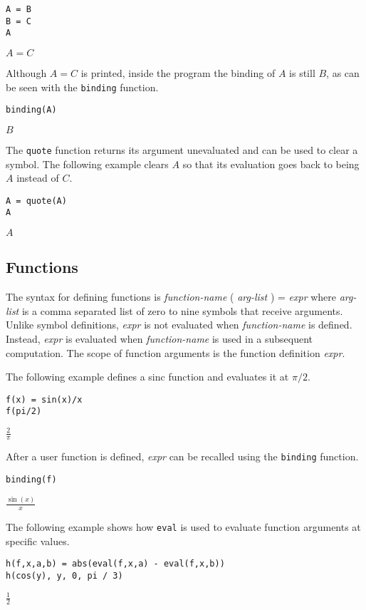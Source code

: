 {\color{blue}
\begin{verbatim}
A = B
B = C
A
\end{verbatim}
}

\noindent
$\displaystyle A=C$

\bigskip
\noindent
Although $A=C$ is printed,
inside the program the binding of $A$ is still $B$, as can be seen with
the \verb$binding$ function.

{\color{blue}
\begin{verbatim}
binding(A)
\end{verbatim}
}

\noindent
$\displaystyle B$

\bigskip
\noindent
The \verb$quote$ function returns its argument unevaluated
and can be used to clear a symbol.
The following example clears $A$ so that its evaluation goes back to
being $A$ instead of $C$.

{\color{blue}
\begin{verbatim}
A = quote(A)
A
\end{verbatim}
}

\noindent
$\displaystyle A$

\subsection{Functions}

\noindent
The syntax for defining functions is {\it function-name} ( {\it arg-list} ) = {\it expr}
where {\it arg-list} is a comma separated list of zero to nine symbols that receive arguments.
Unlike symbol definitions, {\it expr} is not evaluated when {\it function-name} is defined.
Instead, {\it expr} is evaluated when {\it function-name} is used in a subsequent computation.
The scope of function arguments is the function definition {\it expr}.

\bigskip

The following example defines a sinc function and evaluates it at $\pi/2$.

{\color{blue}
\begin{verbatim}
f(x) = sin(x)/x
f(pi/2)
\end{verbatim}
}

\noindent
$\displaystyle \frac{2}{\pi}$

\bigskip

After a user function is defined, {\it expr} can be recalled using the \verb$binding$ function.

{\color{blue}
\begin{verbatim}
binding(f)
\end{verbatim}
}

\noindent
$\displaystyle \frac{\sin(x)}{x}$

\bigskip

The following example shows how \verb$eval$ is used to evaluate function arguments at specific values.

{\color{blue}
\begin{verbatim}
h(f,x,a,b) = abs(eval(f,x,a) - eval(f,x,b))
h(cos(y), y, 0, pi / 3)
\end{verbatim}
}

\noindent
$\frac{1}{2}$
